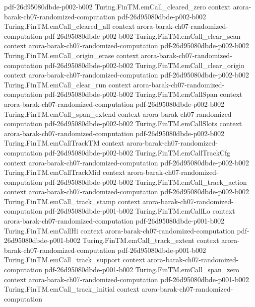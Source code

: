 \begin{theorem}
  {pdf-26d95080dbde-p002-b002}
\proofstep
  {Turing.FinTM.emCall_cleared_zero}
  {context}
  {arora-barak-ch07-randomized-computation}
  {pdf-26d95080dbde-p002-b002}
\proofstep
  {Turing.FinTM.emCall_cleared_all}
  {context}
  {arora-barak-ch07-randomized-computation}
  {pdf-26d95080dbde-p002-b002}
\proofstep
  {Turing.FinTM.emCall_clear_scan}
  {context}
  {arora-barak-ch07-randomized-computation}
  {pdf-26d95080dbde-p002-b002}
\proofstep
  {Turing.FinTM.emCall_origin_erase}
  {context}
  {arora-barak-ch07-randomized-computation}
  {pdf-26d95080dbde-p002-b002}
\proofstep
  {Turing.FinTM.emCall_clear_origin}
  {context}
  {arora-barak-ch07-randomized-computation}
  {pdf-26d95080dbde-p002-b002}
\proofstep
  {Turing.FinTM.emCall_clear_run}
  {context}
  {arora-barak-ch07-randomized-computation}
  {pdf-26d95080dbde-p002-b002}
\proofstep
  {Turing.FinTM.emCallSpan}
  {context}
  {arora-barak-ch07-randomized-computation}
  {pdf-26d95080dbde-p002-b002}
\proofstep
  {Turing.FinTM.emCall_span_extend}
  {context}
  {arora-barak-ch07-randomized-computation}
  {pdf-26d95080dbde-p002-b002}
\proofstep
  {Turing.FinTM.emCallSlots}
  {context}
  {arora-barak-ch07-randomized-computation}
  {pdf-26d95080dbde-p002-b002}
\proofstep
  {Turing.FinTM.emCallTrackTM}
  {context}
  {arora-barak-ch07-randomized-computation}
  {pdf-26d95080dbde-p002-b002}
\proofstep
  {Turing.FinTM.emCallTrackCfg}
  {context}
  {arora-barak-ch07-randomized-computation}
  {pdf-26d95080dbde-p002-b002}
\proofstep
  {Turing.FinTM.emCallTrackMid}
  {context}
  {arora-barak-ch07-randomized-computation}
  {pdf-26d95080dbde-p002-b002}
\proofstep
  {Turing.FinTM.emCall_track_action}
  {context}
  {arora-barak-ch07-randomized-computation}
  {pdf-26d95080dbde-p002-b002}
\proofstep
  {Turing.FinTM.emCall_track_stamp}
  {context}
  {arora-barak-ch07-randomized-computation}
  {pdf-26d95080dbde-p001-b002}
\proofstep
  {Turing.FinTM.emCallLo}
  {context}
  {arora-barak-ch07-randomized-computation}
  {pdf-26d95080dbde-p001-b002}
\proofstep
  {Turing.FinTM.emCallHi}
  {context}
  {arora-barak-ch07-randomized-computation}
  {pdf-26d95080dbde-p001-b002}
\proofstep
  {Turing.FinTM.emCall_track_extent}
  {context}
  {arora-barak-ch07-randomized-computation}
  {pdf-26d95080dbde-p001-b002}
\proofstep
  {Turing.FinTM.emCall_track_support}
  {context}
  {arora-barak-ch07-randomized-computation}
  {pdf-26d95080dbde-p001-b002}
\proofstep
  {Turing.FinTM.emCall_span_zero}
  {context}
  {arora-barak-ch07-randomized-computation}
  {pdf-26d95080dbde-p001-b002}
\proofstep
  {Turing.FinTM.emCall_track_initial}
  {context}
  {arora-barak-ch07-randomized-computation}

\end{theorem}
